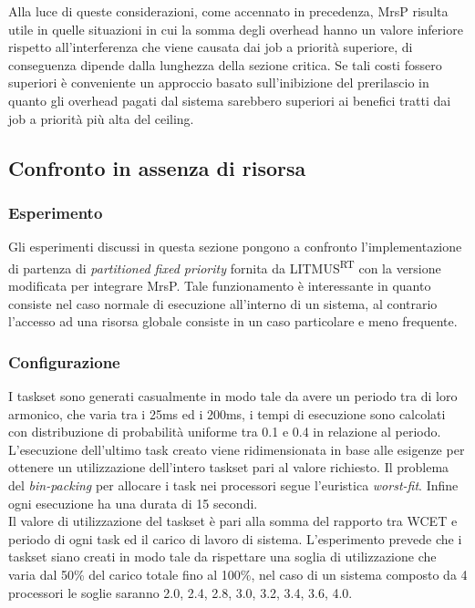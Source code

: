 \noindent Alla luce di queste considerazioni, come accennato in precedenza, MrsP risulta utile in quelle situazioni in cui la somma degli overhead hanno un valore inferiore rispetto all'interferenza che viene causata dai job a priorità superiore, di conseguenza dipende dalla lunghezza della sezione critica. Se tali costi fossero superiori è conveniente un approccio basato sull'inibizione del prerilascio in quanto gli overhead pagati dal sistema sarebbero superiori ai benefici tratti dai job a priorità più alta del ceiling.

\subsection{Confronto in assenza di risorsa}
\label{sec:confronto_norisorsa}

\subsubsection{Esperimento}
\label{sec:confronto_norisorsa_exp}

\noindent Gli esperimenti discussi in questa sezione pongono a confronto l'implementazione di partenza di \textit{partitioned fixed priority} fornita da LITMUS\textsuperscript{RT} con la versione modificata per integrare MrsP. Tale funzionamento è interessante in quanto consiste nel caso normale di esecuzione all'interno di un sistema, al contrario l'accesso ad una risorsa globale consiste in un caso particolare e meno frequente.

\subsubsection{Configurazione}
\label{sec:confronto_norisorsa_conf}

\noindent I taskset sono generati casualmente in modo tale da avere un periodo tra di loro armonico, che varia tra i 25ms ed i 200ms, i tempi di esecuzione sono calcolati con distribuzione di probabilità uniforme tra 0.1 e 0.4 in relazione al periodo. L'esecuzione dell'ultimo task creato viene ridimensionata in base alle esigenze per ottenere un utilizzazione dell'intero taskset pari al valore richiesto. Il problema del \textit{bin-packing} per allocare i task nei processori segue l'euristica \textit{worst-fit}. Infine ogni esecuzione ha una durata di 15 secondi.\\

\noindent Il valore di utilizzazione del taskset è pari alla somma del rapporto tra WCET e periodo di ogni task ed il carico di lavoro di sistema. L'esperimento prevede che i taskset siano creati in modo tale da rispettare una soglia di utilizzazione che varia dal 50\% del carico totale fino al 100\%, nel caso di un sistema composto da 4 processori le soglie saranno 2.0, 2.4, 2.8, 3.0, 3.2, 3.4, 3.6, 4.0.

